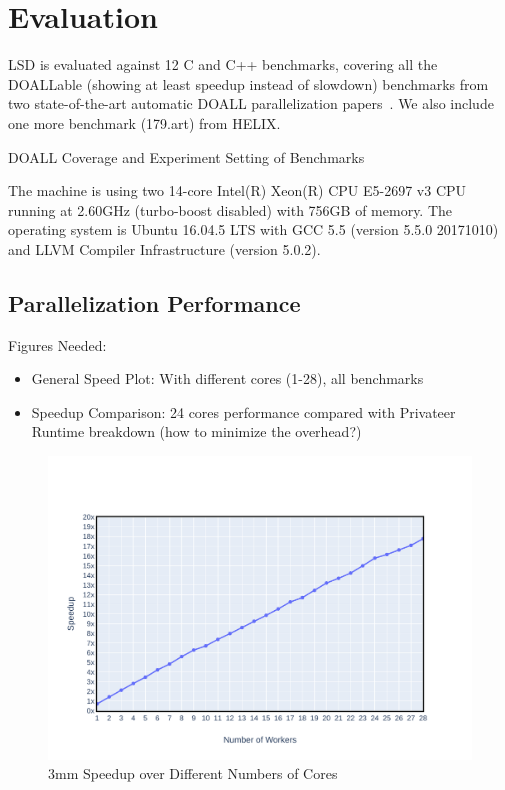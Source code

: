 \section{Evaluation}

LSD is evaluated against 12 C and C++ benchmarks, covering all the DOALLable
(showing at least speedup instead of slowdown) benchmarks from two
state-of-the-art automatic DOALL parallelization
papers~\cite{johnson:12:pldi,kim:12:cgo}. We also include one more benchmark
(179.art) from HELIX.

\begin{table}
  
  \caption{
    DOALL Coverage and Experiment Setting of Benchmarks
  }
  \label{tab:benchmark-list}
    \vspace{-5pt}
\end{table}

The machine is using two 14-core Intel(R) Xeon(R)
CPU E5-2697 v3 CPU running at 2.60GHz (turbo-boost disabled) with 756GB of
memory. The operating system is Ubuntu 16.04.5 LTS with GCC 5.5 (version 5.5.0
20171010) and LLVM Compiler
Infrastructure (version 5.0.2).


\subsection{Parallelization Performance}
Figures Needed:
\begin{itemize}
\item General Speed Plot: With different cores (1-28), all benchmarks
\item Speedup Comparison: 24 cores performance compared with Privateer
Runtime breakdown (how to minimize the overhead?)

\end{itemize}

\begin{figure}[htp]
  \includegraphics[width=\textwidth]{figures/3mm-scale-crop}
  \caption{3mm Speedup over Different Numbers of Cores}
  \label{fig:3mm-scale}
\end{figure}

